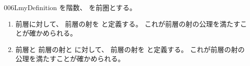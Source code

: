 \documentclass[index]{subfiles}
\begin{document}
\begin{myBlock}{006L}{myDefinition}
  を階数、
  を前圏とする。
  \begin{enumerate}
  \item 前層に対して、
    前層の射を
    と定義する。
    これが前層の射の公理を満たすことが確かめられる。
  \item 前層と
    前層の射と
    に対して、
    前層の射を
    と定義する。
    これが前層の射の公理を満たすことが確かめられる。
  \end{enumerate}
\end{myBlock}
\end{document}
